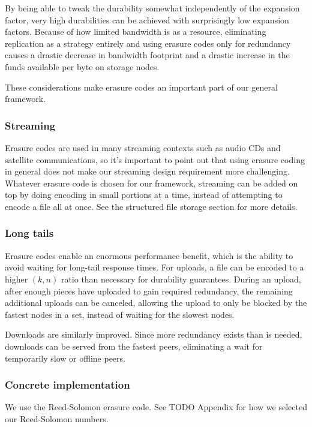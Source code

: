 \documentclass[a4paper,10pt]{article}
\newcommand{\todo}[1]{{\color{red} TODO #1}}
\begin{document}
By being able to tweak the durability somewhat independently of the expansion
factor, very high durabilities can be achieved with surprisingly low expansion
factors. Because of how limited bandwidth is as a resource, eliminating
replication as a strategy entirely and using erasure codes only for redundancy
causes a drastic decrease in bandwidth footprint and a drastic increase in the
funds available per byte on storage nodes.

These considerations make erasure codes an important part of our general
framework.

\subsubsection{Streaming}

Erasure codes are used in many streaming contexts such as audio CDs and
satellite communications, so it's important to point out that using
erasure coding in general does not make our streaming design requirement
more challenging. Whatever erasure code is chosen for our framework, streaming
can be added on top by doing encoding in small portions at a time, instead of
attempting to encode a file all at once. See the structured file storage
section for more details.

\subsubsection{Long tails}

Erasure codes enable an enormous performance benefit, which is the ability
to avoid waiting for long-tail response times.\cite{tail-at-scale} For uploads,
a file can be encoded to a higher $(k, n)$ ratio than necessary for durability
guarantees. During an upload, after enough pieces have uploaded to gain
required redundancy, the remaining additional uploads can be canceled, allowing
the upload to only be blocked by the fastest nodes in a set, instead of waiting
for the slowest nodes.

Downloads are similarly improved. Since more redundancy exists than is needed,
downloads can be served from the fastest peers, eliminating a wait for
temporarily slow or offline peers.

\subsubsection{Concrete implementation}

We use the Reed-Solomon erasure code. See \todo{Appendix} for how we selected
our Reed-Solomon numbers.
\end{document}
